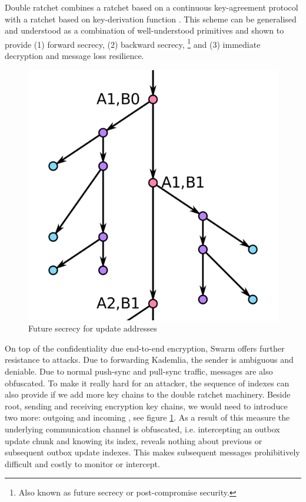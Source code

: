 Double ratchet combines a ratchet based on a continuous key-agreement protocol with a ratchet based on key-derivation function \cite{perrin2016double}. This scheme can be generalised \cite{alwen2019double} and understood as a combination of well-understood primitives and shown to provide  (1) forward secrecy, (2) backward secrecy,%
%
\footnote{Also known as future secrecy or post-compromise security.}
%
and (3) immediate decryption and message loss resilience.


\begin{figure}[htbp]
\centering
\includegraphics[width=.6\textwidth]{fig/double-ratchet.png}
\caption[Future secrecy for update addresses \statusorange]{Future secrecy for update addresses}
\label{fig:double-ratchet-for-feeds}
\end{figure}

On top of the confidentiality due end-to-end encryption, Swarm offers further resistance to attacks. Due to forwarding Kademlia, the sender is ambiguous and deniable. Due to normal push-sync and pull-sync traffic, messages are also obfuscated. To make it really hard for an attacker, the sequence of indexes can also provide  if we add more key chains to the double ratchet machinery. Beside root, sending and receiving encryption key chains, we would need to introduce two more: outgoing and incoming , see figure \ref{fig:double-ratchet-for-feeds}. As a result of this measure the underlying communication channel is obfuscated, i.e. intercepting an outbox update chunk and knowing its index, reveals nothing about previous or subsequent outbox update indexes. This makes subsequent messages prohibitively difficult and costly to monitor or intercept.


